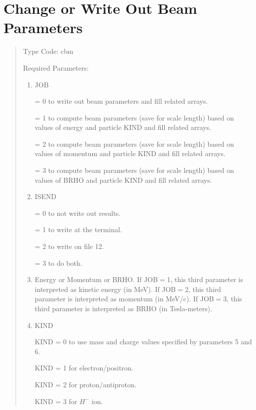 \section{Change or Write Out Beam Parameters}
\begin{quotation}
\noindent Type Code:  cbm
\vspace{5mm}

\noindent Required Parameters:
\begin{enumerate}
      \item  JOB

= 0 to write out beam parameters and fill related arrays.

             = 1 to compute beam parameters (save for scale length) based on values of \hspace*{1em}energy and particle KIND and fill related arrays.

= 2 to compute beam parameters (save for scale length) based on values of \hspace*{1em}momentum and particle KIND and fill related arrays.


			 = 3 to compute beam parameters (save for scale length) based on values \hspace*{1em}of BRHO and particle KIND and fill related arrays.

      \item  ISEND

             = 0 to not write out results.

             = 1 to write at the terminal.

             = 2 to write on file 12.

             = 3 to do both.

      \item  Energy or Momentum or BRHO.  If JOB$=$1, this third parameter is interpreted as kinetic energy (in MeV).  If JOB$=$2, this third parameter is interpreted as momentum (in MeV/c).  If JOB$=$3, this third parameter is interpreted as BRHO (in Tesla-meters).

      \item  KIND

             KIND = 0 to use mass and charge values specified by parameters 5 and 6.

             KIND = 1 for electron/positron.

             KIND = 2 for proton/antiproton.

             KIND = 3 for $H^-$ ion.


\end{enumerate}
\end{quotation}
